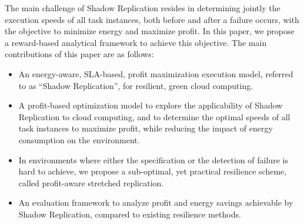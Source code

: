 
The main challenge of Shadow Replication resides in determining
jointly the execution speeds of all task instances, both before and
after a failure occurs, with the objective to minimize energy and
maximize profit.  In this paper, we propose a reward-based analytical
framework to achieve this objective. The main contributions of this paper
are as follows:

\begin{itemize}

\item An energy-aware, SLA-based, profit maximization execution model, referred to as
``Shadow Replication'', for resilient, green cloud computing.

\item A profit-based optimization model to explore the applicability of
  Shadow Replication to cloud computing, and to determine the optimal
  speeds of all task instances to maximize profit, while reducing the impact of energy consumption on the environment.

\item In environments where either the specification or
the detection of failure is hard to achieve, we propose a sub-optimal,
yet practical resilience scheme, called profit-aware stretched
replication.

\item An evaluation framework to analyze profit and 
energy savings achievable by Shadow Replication, compared to existing resilience methods.

\end{itemize}

